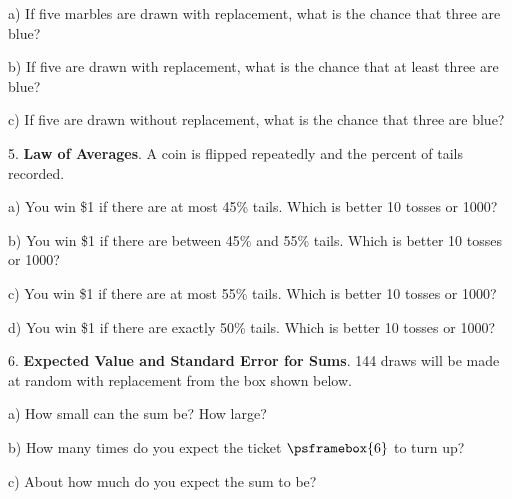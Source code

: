 \documentclass[10pt]{article}
\begin{document}
\hspace{10pt} a) If five marbles are drawn with replacement, what is the chance that three are blue?
\vspace{1in}

\hspace{10pt} b) If five  are drawn with replacement, what is the chance that at least three are blue?
\vspace{1.5in}

\hspace{10pt} c) If five  are drawn without replacement, what is the chance that three are blue?
\vfill
\eject

5. \textbf{Law of Averages}.  A coin is flipped repeatedly and the percent of tails recorded.

\hspace{10pt} a) You win \$1 if there are at most 45\% tails.  Which is better 10 tosses or 1000?
\vspace{.2in}

\hspace{10pt} b) You win \$1 if there are between  45\% and 55\% tails.  Which is better 10 tosses or 1000?
\vspace{.2in}

\hspace{10pt} c) You win \$1 if there are at most 55\% tails.  Which is better 10 tosses or 1000?
\vspace{.2in}

\hspace{10pt} d) You win \$1 if there are exactly  50\% tails. Which is better 10 tosses or 1000?
\vspace{.2in}

6. \textbf{Expected Value and Standard Error for Sums}.  
144 draws will be made at random with replacement
from the box shown below.\vspace{-20pt}
\begin{center}
\end{center}
\hspace{10pt} a)  How small can the sum be?  How large?
\vspace{.5in}

\hspace{10pt} b) How many times do you expect the ticket $\psframebox{6}$ to turn up?
\vspace{.4in}

\hspace{10pt} c) About how much do you expect the sum to be?
\vspace{.6in}
\end{document}
